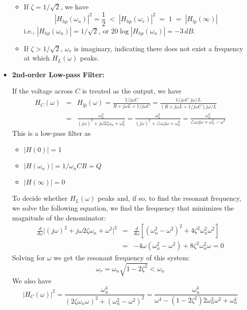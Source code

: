 \begin{itemize}
\begin{itemize}
  \item If $\zeta=1/\sqrt{2}$, we have
    \[
    |H_{hp}(\omega_n)|^2=\frac{1}{2}\;<\; |H_{hp}(\omega_r)|^2\;=\;1
    \;=\;|H_{lp}(\infty)|
    \]
    i.e., $|H_{hp}(\omega_n)|=1/\sqrt{2}$, or $20\log |H_{hp}(\omega_n)|=-3\,dB$.
  \item If $\zeta>1/\sqrt{2}$, $\omega_r$ is imaginary, indicating
    there does not exist a frequency at which $H_L(\omega)$ peaks. 
  \end{itemize}

\item {\bf 2nd-order Low-pass Filter:}

  If the voltage across $C$ is treated as the output, we have
  \begin{eqnarray}
    H_C(\omega)&=&H_{lp}(\omega)=\frac{1/j\omega C}{R+j\omega L+1/j\omega C}
    =\frac{1/j\omega C\;j\omega/L}{(R+j\omega L+1/j\omega C)j\omega/L}
    \nonumber\\
    &=&\frac{\omega_n^2}{(j\omega)^2+j\omega 2\zeta \omega_n+\omega_n^2} 
    =\frac{\omega_n^2}{(j\omega)^2+\triangle \omega j\omega+\omega_n^2}
    =\frac{\omega_n^2}{\triangle \omega j\omega+\omega_n^2-\omega^2}
    \nonumber
  \end{eqnarray}
  This is a low-pass filter as
  \begin{itemize}
  \item $|H(0)|=1$
  \item $|H(\omega_n)|=1/\omega_nCR=Q$
  \item $|H(\infty)|=0$
  \end{itemize}
  To decide whether $H_L(\omega)$ peaks and, if so, to find the resonant
  frequency, we solve the following equation, we find the frequency that
  minimizes the magnitude of the denominator: 
  \begin{eqnarray}
    \frac{d}{d\omega}\bigg|(j\omega)^2+j\omega 2\zeta\omega_n+\omega^2\bigg|^2
    &=&\frac{d}{d\omega} [(\omega_n^2-\omega^2)^2+4\zeta^2\omega_n^2\omega^2]
    \nonumber\\
    &=&-4\omega(\omega_n^2-\omega^2)+8\zeta^2\omega_n^2\omega=0
    \nonumber
  \end{eqnarray}
  Solving for $\omega$ we get the resonant frequency of this system:
  \[
  \omega_r=\omega_n\sqrt{1-2\zeta^2}<\omega_n
  \]
  We also have
  \[
  |H_C(\omega)|^2=\frac{\omega_n^4}{(2\zeta\omega_n\omega)^2+(\omega_n^2-\omega^2)^2}
  =\frac{\omega_n^4}{\omega^4-(1-2\zeta^2)2\omega_n^2\omega^2+\omega_n^4}
  \]


\end{itemize}
